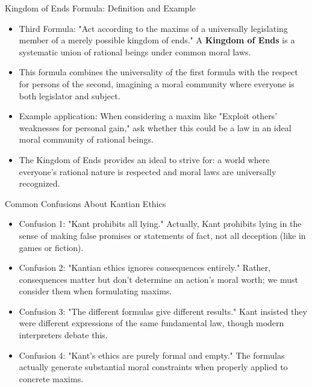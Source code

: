 \documentclass{beamer}
\begin{document}
\begin{frame}{Kingdom of Ends Formula: Definition and Example}
\begin{itemize}
    \item Third Formula: "Act according to the maxims of a universally legislating member of a merely possible kingdom of ends." A \textbf{Kingdom of Ends} is a systematic union of rational beings under common moral laws.
    
    \item This formula combines the universality of the first formula with the respect for persons of the second, imagining a moral community where everyone is both legislator and subject.
    
    \item Example application: When considering a maxim like "Exploit others' weaknesses for personal gain," ask whether this could be a law in an ideal moral community of rational beings.
    
    \item The Kingdom of Ends provides an ideal to strive for: a world where everyone's rational nature is respected and moral laws are universally recognized.
\end{itemize}
\end{frame}


\begin{frame}{Common Confusions About Kantian Ethics}
\begin{itemize}
    \item Confusion 1: "Kant prohibits all lying." Actually, Kant prohibits lying in the sense of making false promises or statements of fact, not all deception (like in games or fiction).
    
    \item Confusion 2: "Kantian ethics ignores consequences entirely." Rather, consequences matter but don't determine an action's moral worth; we must consider them when formulating maxims.
    
    \item Confusion 3: "The different formulas give different results." Kant insisted they were different expressions of the same fundamental law, though modern interpreters debate this.
    
    \item Confusion 4: "Kant's ethics are purely formal and empty." The formulas actually generate substantial moral constraints when properly applied to concrete maxims.
\end{itemize}
\end{frame}
\end{document}
